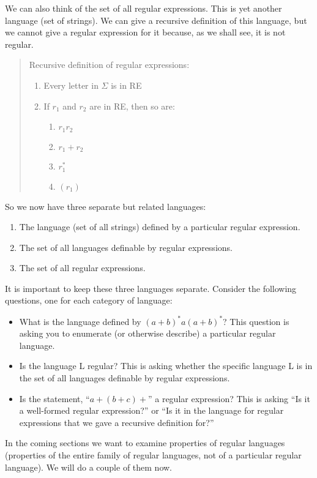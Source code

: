 \documentclass[letterpaper,12pt,openany,reqno]{book}%
\begin{document}
We can also think of the set of all regular expressions. This is yet another language (set of strings). We can give a recursive definition of this language, but we cannot give a regular expression for it because, as we shall see, it is not regular.

\begin{quote}
Recursive definition of regular expressions:

\begin{enumerate}
\item Every letter in $\Sigma$ is in RE
\item If $r_1$ and $r_2$ are in RE, then so are:
\begin{enumerate}
\item $r_1 r_2$
\item $r_1 + r_2$
\item $r_1^*$
\item $(r_1)$
\end{enumerate}
\end{enumerate}
\end{quote}

So we now have three separate but related languages:
\begin{enumerate}
\item The language (set of all strings) defined by a particular regular expression.
\item The set of all languages definable by regular expressions.
\item The set of all regular expressions.
\end{enumerate}

It is important to keep these three languages separate. Consider the following questions, one for each category of language:
\begin{itemize}
\item What is the language defined by $(a + b)^*a(a + b)^*$? This question is asking you to enumerate (or otherwise describe) a particular regular language.
\item Is the language L regular? This is asking whether the specific language L is in the set of all languages definable by regular expressions.
\item Is the statement, ``$a + (b + c)+$'' a regular expression? This is asking ``Is it a well-formed regular expression?'' or ``Is it in the language for regular expressions that we gave a recursive definition for?''
\end{itemize}

In the coming sections we want to examine properties of regular languages (properties of the entire family of regular languages, not of a particular regular language). We will do a couple of them now.
\end{document}

